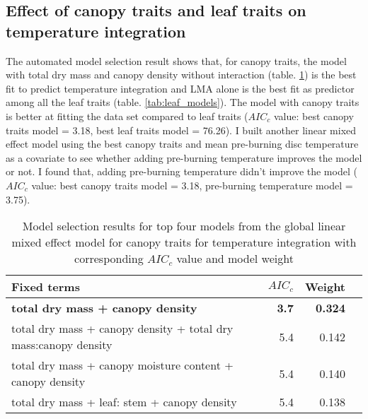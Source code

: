 \documentclass[12pt]{report}
\begin{document}

\subsection{Effect of canopy traits and leaf traits on temperature integration}

The automated model selection result shows that, for canopy traits, the model with total dry mass and canopy density without interaction (table. \ref{tab:canopy_models}) is the best fit to predict temperature integration and \MakeUppercase{lma} alone is the best fit as predictor among all the leaf traits (table. \ref{tab:leaf_models}). The model with canopy traits is better at fitting the data set compared to leaf traits ($AIC_{c}$ value: best canopy traits model = 3.18, best leaf traits model = 76.26). I built another linear mixed effect model using the best canopy traits and mean pre-burning disc temperature as a covariate to see whether adding pre-burning temperature improves the model or not. I found that, adding pre-burning temperature didn't improve the model ($AIC_{c}$ value: best canopy traits model = 3.18, pre-burning temperature model = 3.75).

\begin{table}
\centering
\caption{Model selection results for top four models from the global linear mixed effect model for canopy traits for temperature integration with corresponding $AIC_{c}$ value and model weight}
\vspace{0.5 cm}
\begin{tabular}{lrrr}
\hline
\textbf{Fixed terms} & $AIC_{c}$ & \textbf{Weight}\\
\hline
\textbf{total dry mass + canopy density}    & \textbf{3.7} &  \textbf{0.324}\\
total dry mass + canopy density + total dry mass:canopy density & 5.4  & 0.142 \\
total dry mass + canopy moisture content + canopy density   & 5.4   & 0.140 \\ 
total dry mass + leaf: stem + canopy density  & 5.4 & 0.138  \\                      
\end{tabular}
\label{tab:canopy_models}
\end{table}
\end{document}

